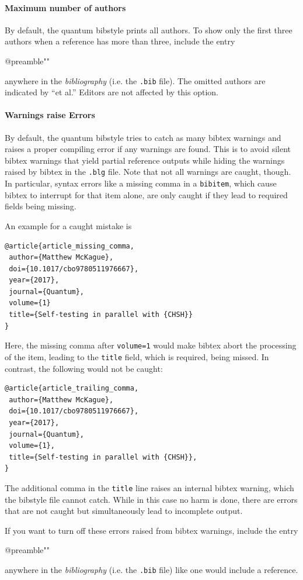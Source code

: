 \documentclass[a4paper,twocolumn,11pt]{quantumarticle}
\begin{document}
\paragraph{Maximum number of authors}
By default, the quantum bibstyle prints all authors. To show only the first three authors when a reference has more than three, include the entry
\begin{verbatim*}
@preamble{""}
\end{verbatim*}
anywhere in the \emph{bibliography} (i.e. the \texttt{.bib} file). The omitted authors are indicated by ``et al.'' Editors are not affected by this option.

\paragraph{Warnings raise Errors}
By default, the quantum bibstyle tries to catch as many bibtex warnings and raises a proper compiling error if any warnings are found. This is to avoid silent bibtex warnings that yield partial reference outputs while hiding the warnings raised by bibtex in the \texttt{.blg} file.
Note that not all warnings are caught, though. In particular, syntax errors like a missing comma in a \texttt{bibitem}, which cause bibtex to interrupt for that item alone, are only caught if they lead to required fields being missing.

An example for a caught mistake is
{\small
\begin{verbatim}
@article{article_missing_comma,
 author={Matthew McKague},
 doi={10.1017/cbo9780511976667},
 year={2017},
 journal={Quantum},
 volume={1}
 title={Self-testing in parallel with {CHSH}}
}
\end{verbatim}
}
Here, the missing comma after \texttt{volume={1}} would make bibtex abort the processing of the item, leading
to the \texttt{title} field, which is required, being missed.
In contrast, the following would not be caught:
{\small
\begin{verbatim}
@article{article_trailing_comma,
 author={Matthew McKague},
 doi={10.1017/cbo9780511976667},
 year={2017},
 journal={Quantum},
 volume={1},
 title={Self-testing in parallel with {CHSH}},
}
\end{verbatim}
}
The additional comma in the \texttt{title} line raises an internal bibtex warning, which the bibstyle file cannot catch. While in this case no harm is done, there are errors that are not caught but simultaneously lead to incomplete output.

If you want to turn off these errors raised from bibtex warnings, include the entry
\begin{verbatim*}
@preamble{"\DoNotMakeWarningsErrors"}
\end{verbatim*}
anywhere in the \emph{bibliography} (i.e. the \texttt{.bib} file) like one would include a reference.
\end{document}
